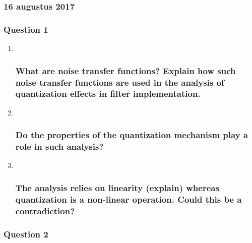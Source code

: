 \documentclass[
  a4paper,
  ,captions=tableheading
]{scrartcl}
\begin{document}
\subsubsection{}\label{section-23}

\subsubsection{\texorpdfstring{\textbf{16 augustus
2017}}{16 augustus 2017}}\label{augustus-2017}

\subsubsection{Question 1}\label{question-1-7}

\begin{enumerate}
\def\labelenumi{\arabic{enumi}.}
\item ~
  \subsubsection{What are noise transfer functions? Explain how such
  noise transfer functions are used in the analysis of quantization
  effects in filter
  implementation.}\label{what-are-noise-transfer-functions-explain-how-such-noise-transfer-functions-are-used-in-the-analysis-of-quantization-effects-in-filter-implementation.-2}
\item ~
  \subsubsection{Do the properties of the quantization mechanism play a
  role in such
  analysis?}\label{do-the-properties-of-the-quantization-mechanism-play-a-role-in-such-analysis-1}
\item ~
  \subsubsection{The analysis relies on linearity (explain) whereas
  quantization is a non-linear operation. Could this be a
  contradiction?}\label{the-analysis-relies-on-linearity-explain-whereas-quantization-is-a-non-linear-operation.-could-this-be-a-contradiction-1}
\end{enumerate}

\subsubsection{Question 2}\label{question-2-7}
\end{document}
